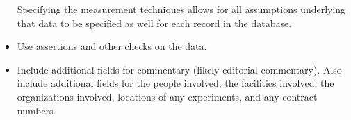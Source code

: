 \begin{itemize}
Specifying the measurement techniques allows for all assumptions underlying
that data to be specified as well for each record in the database.

\item

Use assertions and other checks on the data.

\item

Include additional fields for commentary (likely editorial commentary).  Also
include additional fields for the people involved, the facilities involved, the
organizations involved, locations of any experiments, and any contract numbers.

\end{itemize}

